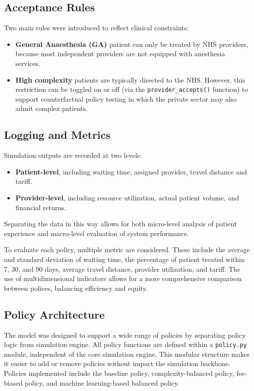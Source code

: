 \documentclass[ %
                    author={Nattanan Nawakitbamrung},
                supervisor={Dr. Sébastien Rochat},
                    degree={MSc},
                     title={Developing and Evaluating the Impact of a Single Patient Treatment List (PTL) for an NHS Integrated Care System},
                  subtitle={},
                      type={},
                      year={2025}]{dissertation}
\begin{document}
\subsection{Acceptance Rules}
Two main rules were introduced to reflect clinical constraints:
\begin{itemize}
    \item \textbf{General Anaesthesia (GA)} patient can only be treated by NHS providers, because most independent providers are not equipped with anesthesia services.
    \item \textbf{High complexity} patients are typically directed to the NHS. However, this restriction can be toggled on or off (via the \texttt{provider\_accepts()} function) to support counterfactual policy testing in which the private sector may also admit complex patients.
\end{itemize}

\subsection{Logging and Metrics}
Simulation outputs are recorded at two levels:
\begin{itemize}
    \item \textbf{Patient-level}, including waiting time, assigned provider, travel distance and tariff.
    \item \textbf{Provider-level}, including resource utilization, actual patient volume, and financial returns.
\end{itemize}
Separating the data in this way allows for both micro-level analysis of patient experience and macro-level evaluation of system performance.

\vspace{0.2cm}
\noindent
To evaluate each policy, multiple metric are considered. These include the average and standard deviation of waiting time, the percentage of patient 
treated within 7, 30, and 90 days, average travel distance, provider utilization, and tariff. The use of multidimensional indicators allows for a more comprehensive comparison between polices, balancing efficiency and equity.

\subsection{Policy Architecture}
The model was designed to support a wide range of policies by separating policy logic from simulation engine. All policy functions are defined within a \texttt{policy.py} module, independent of the core simulation engine. This modular structure makes it easier to add or remove policies without impact the simulation backbone. Policies implemented include the baseline policy, complexity-balanced policy, fee-biased policy, and machine learning-based balanced policy.
\end{document}
